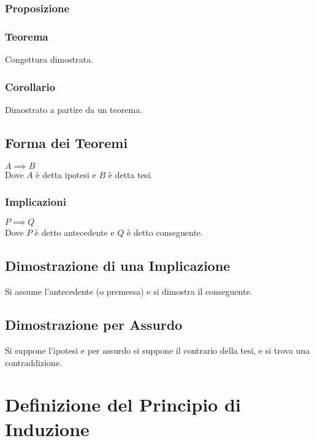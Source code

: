 \documentclass[a4paper, twoside, italian, 11pt]{book}
\begin{document}
\subsubsection{Proposizione}


\subsubsection{Teorema}

\noindent
Congettura dimostrata.


\subsubsection{Corollario}

\noindent
Dimostrato a partire da un teorema.


\subsection{Forma dei Teoremi}

\noindent
$A \implies B$ \\

\noindent
Dove $A$ è detta ipotesi e $B$ è detta tesi.


\subsubsection{Implicazioni}

\noindent
$P \implies Q$ \\

\noindent
Dove $P$ è detto antecedente e $Q$ è detto conseguente.


\subsection{Dimostrazione di una Implicazione}

\noindent
Si assume l'antecedente (o premessa) e si dimostra il conseguente.


\subsection{Dimostrazione per Assurdo}

\noindent
Si suppone l'ipotesi e per assurdo si suppone il contrario della tesi, e si trova una contraddizione.



\section{Definizione del Principio di Induzione}
\end{document}
